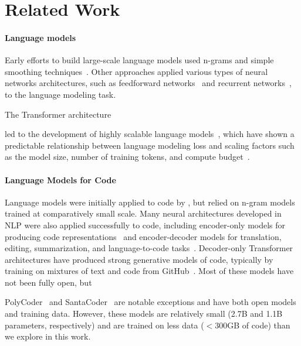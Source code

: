 \section{Related Work}
\paragraph{Language models} 

Early efforts to build large-scale language models used n-grams and simple smoothing techniques~\citep{brants2007large,heafield2013scalable,buck2014n}. Other approaches applied various types of neural networks architectures, such as feedforward networks~\citep{bengio2000neural} and recurrent  networks~\citep{mikolov2010recurrent,jozefowicz2016exploring}, to the language modeling task. 

The Transformer architecture~\citep{vaswani2017attention}

led to the development of highly scalable language models~\citep{radford2019language,brown2020language}, which have shown a predictable relationship between language modeling loss and scaling factors such as the model size, number of training tokens, and compute budget~\citep{kaplan2020scaling,hoffmann2022training}. 

\paragraph{Language Models for Code} Language models were initially applied to code by \citet{hindle2012naturalness}, but relied on n-gram models trained at comparatively small scale. Many neural architectures developed in NLP were also applied successfully to code, including encoder-only models for producing code representations~\citep{feng2020codebert,kanade2020embeddings} and encoder-decoder models for translation, editing, summarization, and language-to-code tasks~\citep{wang-etal-2021-codet5,ahmad2021plbart,li2022competition}. Decoder-only Transformer architectures have produced strong generative models of code, typically by training on mixtures of text and code from GitHub~\citep{chen2021codex,austin2021program,fried2022incoder,qinkai:codegeex,nijkamp:codegen}. Most of these models have not been fully open, but

PolyCoder~\citep{xu2022systematicevaluation} and SantaCoder~\citep{allal2023santacoder} are notable exceptions and have both open models and training data.  However, these models are relatively small (2.7B and 1.1B parameters, respectively) and are trained on less data ($<300$GB of code) than we explore in this work.

